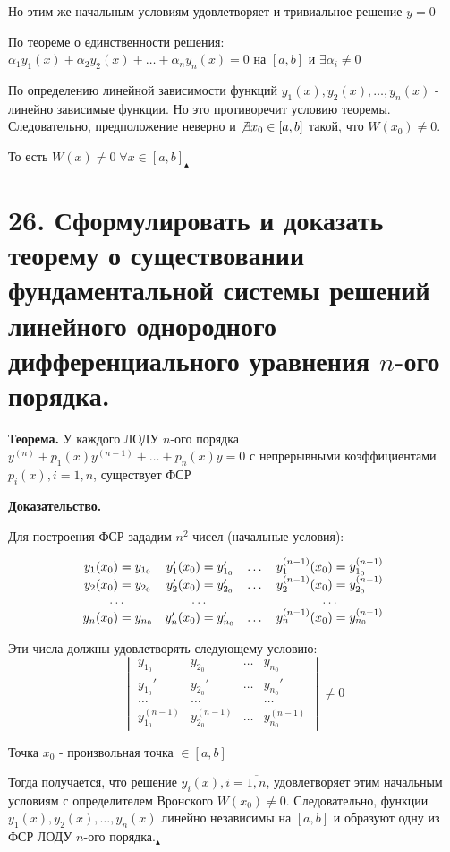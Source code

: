 \documentclass[11pt]{article}
\begin{document}
\par Но этим же начальным условиям удовлетворяет и тривиальное решение $y = 0$
\par По теореме о единственности решения: $\alpha_{1}y_{1}(x) + \alpha_{2}y_{2}(x) + \dots + \alpha_{n}y_{n}(x) = 0$ на $[a, b]$ и $\exists\alpha_{i} \neq 0$
\par По определению линейной зависимости функций $y_{1}(x), y_{2}(x), \dots, y_{n}(x)$ - линейно зависимые функции. Но это противоречит условию теоремы. Следовательно, предположение неверно и \newline$\not\exists x_{0} \in [a, b]$ такой, что $W(x_{0}) \neq 0$.
\par То есть $W(x) \neq 0 \; \forall x \in [a, b] _{\blacktriangle}$

\section*{26. Сформулировать и доказать теорему о существовании фундаментальной системы решений линейного однородного дифференциального уравнения $n$-ого порядка.}
\par\textbf{Теорема.} У каждого ЛОДУ $n$-ого порядка $y^{(n)} + p_{1}(x)y^{(n-1)} + \dots + p_{n}(x)y = 0$ с непрерывными коэффициентами $p_{i}(x), i = \overline{1, n}$, существует ФСР
\par\textbf{Доказательство.}
\par Для построения ФСР зададим $n^2$ чисел (начальные условия):
\par \[\begin{array}{c c c c}
y_{1}(x_{0}) = y_{1_{0}} & y_{1}'(x_{0}) = y_{1_{0}}' & \dots & y_{1}^{(n-1)}(x_{0}) = y_{1_{0}}^{(n-1)} \\
y_{2}(x_{0}) = y_{2_{0}} & y_{2}'(x_{0}) = y_{2_{0}}' & \dots & y_{2}^{(n-1)}(x_{0}) = y_{2_{0}}^{(n-1)} \\
\dots & \dots & & \dots \\
y_{n}(x_{0}) = y_{n_{0}} & y_{n}'(x_{0}) = y_{n_{0}}' & \dots & y_{n}^{(n-1)}(x_{0}) = y_{n_{0}}^{(n-1)} 
\end{array}\]
\par Эти числа должны удовлетворять следующему условию:$$\begin{vmatrix}{}
y_{1_{0}} & y_{2_{0}} & \dots & y_{n_{0}} \\
y_{1_{0}}' & y_{2_{0}}' & \dots & y_{n_{0}}' \\
\dots & \dots & & \dots \\
y_{1_{0}}^{(n-1)} & y_{2_{0}}^{(n-1)} & \dots & y_{n_{0}}^{(n-1)}
\end{vmatrix} \neq 0$$
\par Точка $x_{0}$ - произвольная точка $\in [a, b]$
\par Тогда получается, что решение $y_{i}(x), i = \overline{1, n}$, удовлетворяет этим начальным условиям с определителем Вронского $W(x_{0}) \neq 0$. Следовательно, функции $y_{1}(x), y_{2}(x), \dots, y_{n}(x)$ линейно независимы на $[a, b]$ и образуют одну из ФСР ЛОДУ $n$-ого порядка.$_{\blacktriangle}$
\end{document}
